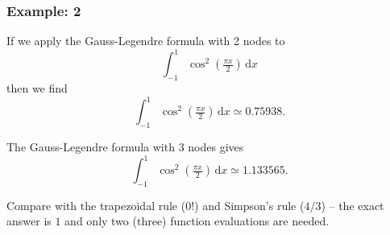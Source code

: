 \documentclass{beamer}
\begin{document}
\begin{frame}
  \frametitle{Example: 2}

  If we apply the Gauss-Legendre formula with 2 nodes to
  \begin{equation*}
    \int_{-1}^{1} \cos^2 \left(\tfrac{\pi x}{2}\right) \, \text{d}x
  \end{equation*}
  then we find
  \begin{equation*}
    \int_{-1}^{1} \cos^2 \left(\tfrac{\pi x}{2}\right) \, \text{d}x
    \simeq 0.75938.
  \end{equation*} \pause


  The Gauss-Legendre formula with 3 nodes gives
  \begin{equation*}
    \int_{-1}^{1} \cos^2 \left(\tfrac{\pi x}{2}\right) \, \text{d}x
    \simeq 1.133565.
  \end{equation*} \pause

  Compare with the trapezoidal rule ($0$!) and Simpson's rule ($4/3$)
  -- the exact answer is $1$ and only two (three) function evaluations
  are needed.

\end{frame}
\end{document}
